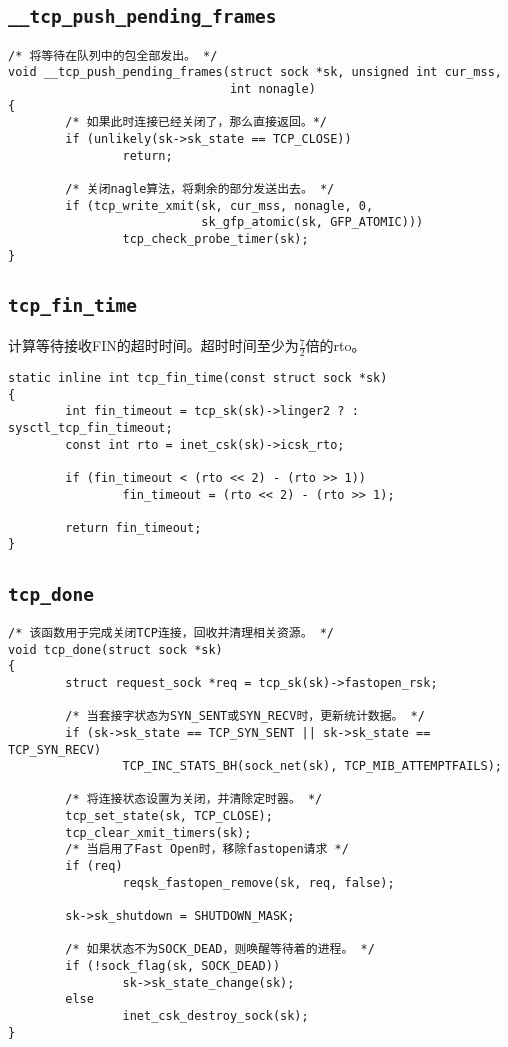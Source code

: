 \subsection{\texttt{__tcp_push_pending_frames}}
\begin{verbatim}
/* 将等待在队列中的包全部发出。 */
void __tcp_push_pending_frames(struct sock *sk, unsigned int cur_mss,
                               int nonagle)
{
        /* 如果此时连接已经关闭了，那么直接返回。*/
        if (unlikely(sk->sk_state == TCP_CLOSE))
                return;

        /* 关闭nagle算法，将剩余的部分发送出去。 */
        if (tcp_write_xmit(sk, cur_mss, nonagle, 0,
                           sk_gfp_atomic(sk, GFP_ATOMIC)))
                tcp_check_probe_timer(sk);
}
\end{verbatim}

\subsection{\texttt{tcp_fin_time}}
计算等待接收FIN的超时时间。超时时间至少为$\frac{7}{2}$倍的rto。
\begin{verbatim}
static inline int tcp_fin_time(const struct sock *sk)
{
        int fin_timeout = tcp_sk(sk)->linger2 ? : sysctl_tcp_fin_timeout;
        const int rto = inet_csk(sk)->icsk_rto;

        if (fin_timeout < (rto << 2) - (rto >> 1))
                fin_timeout = (rto << 2) - (rto >> 1);

        return fin_timeout;
}
\end{verbatim}

\subsection{\texttt{tcp_done}}
\begin{verbatim}
/* 该函数用于完成关闭TCP连接，回收并清理相关资源。 */
void tcp_done(struct sock *sk)
{
        struct request_sock *req = tcp_sk(sk)->fastopen_rsk;

        /* 当套接字状态为SYN_SENT或SYN_RECV时，更新统计数据。 */
        if (sk->sk_state == TCP_SYN_SENT || sk->sk_state == TCP_SYN_RECV)
                TCP_INC_STATS_BH(sock_net(sk), TCP_MIB_ATTEMPTFAILS);

        /* 将连接状态设置为关闭，并清除定时器。 */
        tcp_set_state(sk, TCP_CLOSE);
        tcp_clear_xmit_timers(sk);
        /* 当启用了Fast Open时，移除fastopen请求 */
        if (req)
                reqsk_fastopen_remove(sk, req, false);

        sk->sk_shutdown = SHUTDOWN_MASK;

        /* 如果状态不为SOCK_DEAD，则唤醒等待着的进程。 */
        if (!sock_flag(sk, SOCK_DEAD))
                sk->sk_state_change(sk);
        else
                inet_csk_destroy_sock(sk);
}
\end{verbatim}


